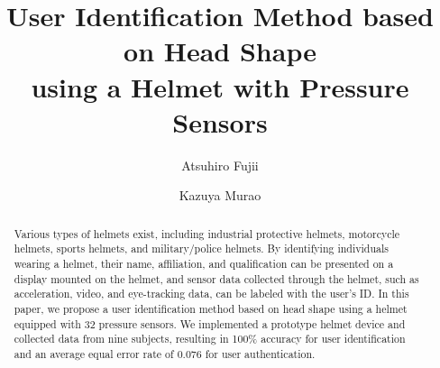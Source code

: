 \documentclass[sigconf,authordraft]{acmart}
\begin{document}
\title{User Identification Method based on Head Shape\\using a Helmet with Pressure Sensors}

\author{Atsuhiro Fujii}

\author{Kazuya Murao}

\renewcommand{\shortauthors}{Fujii and Murao}

\begin{abstract}
Various types of helmets exist, including industrial protective helmets, motorcycle helmets, sports helmets, and military/police helmets. By identifying individuals wearing a helmet, their name, affiliation, and qualification can be presented on a display mounted on the helmet, and sensor data collected through the helmet, such as acceleration, video, and eye-tracking data, can be labeled with the user's ID. In this paper, we propose a user identification method based on head shape using a helmet equipped with 32 pressure sensors.
We implemented a prototype helmet device and collected data from nine subjects, resulting in 100\% accuracy for user identification and an average equal error rate of 0.076 for user authentication.
\end{abstract}
\end{document}
